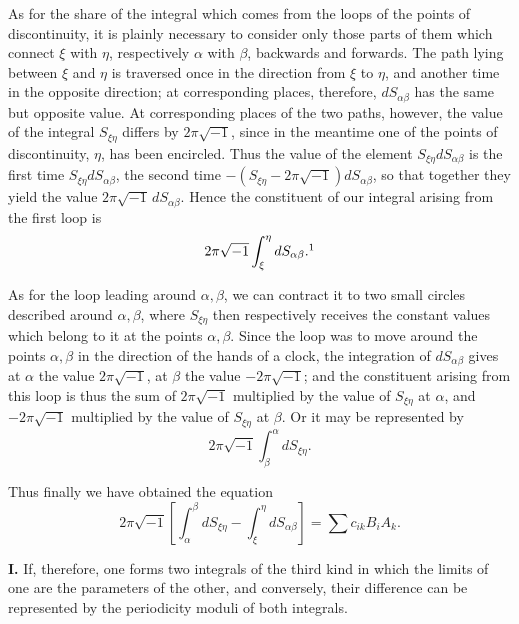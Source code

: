 \documentclass[10pt]{article}
\begin{document}
As for the share of the integral which comes from the loops of the points of discontinuity, it is plainly necessary to consider only those parts of them which connect \(\xi\) with \(\eta\), respectively \(\alpha\) with \(\beta\), backwards and forwards. The path lying between \(\xi\) and \(\eta\) is traversed once in the direction from \(\xi\) to \(\eta\), and another time in the opposite direction; at corresponding places, therefore, \(dS_{\alpha\beta}\) has the same but opposite value. At corresponding places of the two paths, however, the value of the integral \(S_{\xi\eta}\) differs by \(2\pi\sqrt{-1}\), since in the meantime one of the points of discontinuity, \(\eta\), has been encircled. Thus the value of the element \(S_{\xi\eta}dS_{\alpha\beta}\) is the first time \(S_{\xi\eta}dS_{\alpha\beta}\), the second time \(-(S_{\xi\eta}-2\pi\sqrt{-1})dS_{\alpha\beta}\), so that together they yield the value \(2\pi\sqrt{-1}\,dS_{\alpha\beta}\). Hence the constituent of our integral arising from the first loop is
\[
2\pi\sqrt{-1}\int_{\xi}^{\eta}dS_{\alpha\beta}.\footnotemark
\]

As for the loop leading around \(\alpha,\beta\), we can contract it to two small circles described around \(\alpha,\beta\), where \(S_{\xi\eta}\) then respectively receives the constant values which belong to it at the points \(\alpha,\beta\). Since the loop was to move around the points \(\alpha,\beta\) in the direction of the hands of a clock, the integration of \(dS_{\alpha\beta}\) gives at \(\alpha\) the value \(2\pi\sqrt{-1}\), at \(\beta\) the value \(-2\pi\sqrt{-1}\); and the constituent arising from this loop is thus the sum of \(2\pi\sqrt{-1}\) multiplied by the value of \(S_{\xi\eta}\) at \(\alpha\), and \(-2\pi\sqrt{-1}\) multiplied by the value of \(S_{\xi\eta}\) at \(\beta\). Or it may be represented by
\[
2\pi\sqrt{-1}\int_{\beta}^{\alpha}dS_{\xi\eta}.
\]

Thus finally we have obtained the equation
\[
\tag{1}
2\pi\sqrt{-1}\left[\int_{\alpha}^{\beta}dS_{\xi\eta}-\int_{\xi}^{\eta}dS_{\alpha\beta}\right]=\sum c_{ik}B_iA_k.
\]

\noindent\textbf{I.} If, therefore, one forms two integrals of the third kind in which the limits of one are the parameters of the other, and conversely, their difference can be represented by the periodicity moduli of both integrals.
\end{document}
